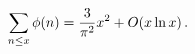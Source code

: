 \[\sum_{n\leq x}\mathop{\phi\/}\nolimits\!\left(n\right)=\frac{3}{\pi^{2}}x^{2}+%
\mathop{O\/}\nolimits\!\left(x\mathop{\ln\/}\nolimits x\right).\]